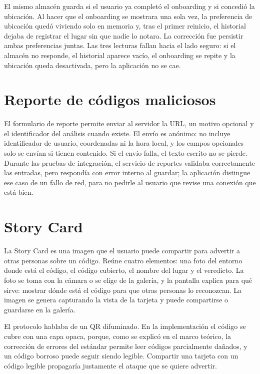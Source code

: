 El mismo almacén guarda si el usuario ya completó el onboarding y si concedió la ubicación. Al hacer que el onboarding se mostrara una sola vez, la preferencia de ubicación quedó viviendo solo en memoria y, tras el primer reinicio, el historial dejaba de registrar el lugar sin que nadie lo notara. La corrección fue persistir ambas preferencias juntas. Las tres lecturas fallan hacia el lado seguro: si el almacén no responde, el historial aparece vacío, el onboarding se repite y la ubicación queda desactivada, pero la aplicación no se cae.

\section{Reporte de códigos maliciosos}

El formulario de reporte permite enviar al servidor la URL, un motivo opcional y el identificador del análisis cuando existe. El envío es anónimo: no incluye identificador de usuario, coordenadas ni la hora local, y los campos opcionales solo se envían si tienen contenido. Si el envío falla, el texto escrito no se pierde. Durante las pruebas de integración, el servicio de reportes validaba correctamente las entradas, pero respondía con error interno al guardar; la aplicación distingue ese caso de un fallo de red, para no pedirle al usuario que revise una conexión que está bien.

\section{Story Card}

La Story Card es una imagen que el usuario puede compartir para advertir a otras personas sobre un código. Reúne cuatro elementos: una foto del entorno donde está el código, el código cubierto, el nombre del lugar y el veredicto. La foto se toma con la cámara o se elige de la galería, y la pantalla explica para qué sirve: mostrar dónde está el código para que otras personas lo reconozcan. La imagen se genera capturando la vista de la tarjeta y puede compartirse o guardarse en la galería.

El protocolo hablaba de un QR difuminado. En la implementación el código se cubre con una capa opaca, porque, como se explicó en el marco teórico, la corrección de errores del estándar permite leer códigos parcialmente dañados, y un código borroso puede seguir siendo legible. Compartir una tarjeta con un código legible propagaría justamente el ataque que se quiere advertir.

